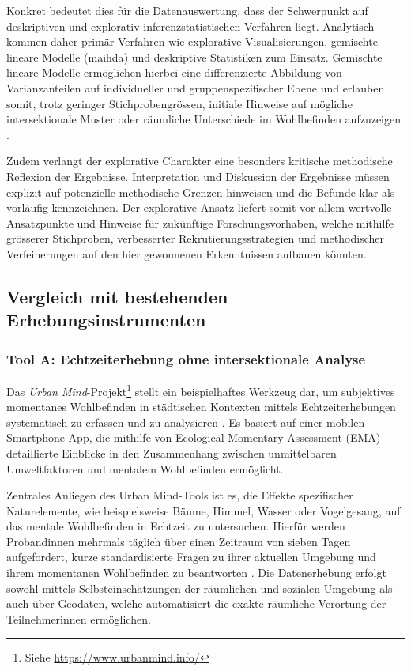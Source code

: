 Konkret bedeutet dies für die Datenauswertung, dass der Schwerpunkt auf deskriptiven und explorativ-inferenzstatistischen Verfahren liegt. Analytisch kommen daher primär Verfahren wie explorative Visualisierungen, gemischte lineare Modelle (\acrshort{maihda}) und deskriptive Statistiken zum Einsatz. Gemischte lineare Modelle ermöglichen hierbei eine differenzierte Abbildung von Varianzanteilen auf individueller und gruppenspezifischer Ebene und erlauben somit, trotz geringer Stichprobengrössen, initiale Hinweise auf mögliche intersektionale Muster oder räumliche Unterschiede im Wohlbefinden aufzuzeigen \parencite{grossModellingIntersectionalityQuantitative2023, bauerIntersectionalityQuantitativeResearch2021}.

Zudem verlangt der explorative Charakter eine besonders kritische methodische Reflexion der Ergebnisse. Interpretation und Diskussion der Ergebnisse müssen explizit auf potenzielle methodische Grenzen hinweisen und die Befunde klar als vorläufig kennzeichnen. Der explorative Ansatz liefert somit vor allem wertvolle Ansatzpunkte und Hinweise für zukünftige Forschungsvorhaben, welche mithilfe grösserer Stichproben, verbesserter Rekrutierungsstrategien und methodischer Verfeinerungen auf den hier gewonnenen Erkenntnissen aufbauen könnten.


\subsection{Vergleich mit bestehenden Erhebungsinstrumenten}

\subsubsection{Tool A: Echtzeiterhebung ohne intersektionale Analyse}

Das \textit{Urban Mind}-Projekt\footnote{Siehe \url{https://www.urbanmind.info/}} stellt ein beispielhaftes Werkzeug dar, um subjektives momentanes Wohlbefinden in städtischen Kontexten mittels Echtzeiterhebungen systematisch zu erfassen und zu analysieren \parencite{bakolisUrbanMindUsing2018}. Es basiert auf einer mobilen Smartphone-App, die mithilfe von Ecological Momentary Assessment (EMA) detaillierte Einblicke in den Zusammenhang zwischen unmittelbaren Umweltfaktoren und mentalem Wohlbefinden ermöglicht.

Zentrales Anliegen des Urban Mind-Tools ist es, die Effekte spezifischer Naturelemente, wie beispielsweise Bäume, Himmel, Wasser oder Vogelgesang, auf das mentale Wohlbefinden in Echtzeit zu untersuchen. Hierfür werden Proband\:innen mehrmals täglich über einen Zeitraum von sieben Tagen aufgefordert, kurze standardisierte Fragen zu ihrer aktuellen Umgebung und ihrem momentanen Wohlbefinden zu beantworten \parencite{bakolisUrbanMindUsing2018}. Die Datenerhebung erfolgt sowohl mittels Selbsteinschätzungen der räumlichen und sozialen Umgebung als auch über Geodaten, welche automatisiert die exakte räumliche Verortung der Teilnehmer\:innen ermöglichen.


